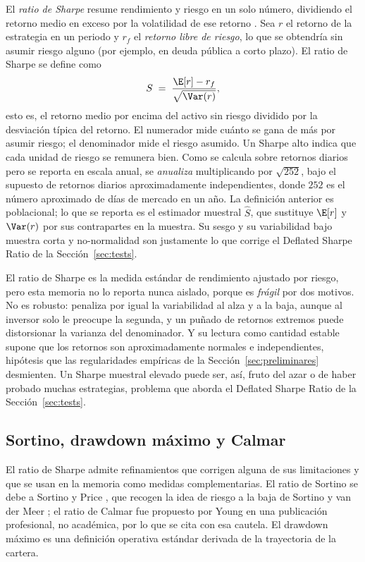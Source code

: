 El \emph{ratio de Sharpe} resume rendimiento y riesgo en un solo número, dividiendo el retorno medio en exceso por la volatilidad de ese retorno \cite{sharpe1994}. Sea $r$ el retorno de la estrategia en un periodo y $r_f$ el \emph{retorno libre de riesgo}, lo que se obtendría sin asumir riesgo alguno (por ejemplo, en deuda pública a corto plazo). El ratio de Sharpe se define como
\[
S \;=\; \frac{\E[r] - r_f}{\sqrt{\Var(r)}},
\]
esto es, el retorno medio por encima del activo sin riesgo dividido por la desviación típica del retorno. El numerador mide cuánto se gana de más por asumir riesgo; el denominador mide el riesgo asumido. Un Sharpe alto indica que cada unidad de riesgo se remunera bien. Como se calcula sobre retornos diarios pero se reporta en escala anual, se \emph{anualiza} multiplicando por $\sqrt{252}$, bajo el supuesto de retornos diarios aproximadamente independientes, donde $252$ es el número aproximado de días de mercado en un año. La definición anterior es poblacional; lo que se reporta es el estimador muestral $\hat S$, que sustituye $\E[r]$ y $\Var(r)$ por sus contrapartes en la muestra. Su sesgo y su variabilidad bajo muestra corta y no-normalidad son justamente lo que corrige el Deflated Sharpe Ratio de la Sección~\ref{sec:tests}.

El ratio de Sharpe es la medida estándar de rendimiento ajustado por riesgo, pero esta memoria no lo reporta nunca aislado, porque es \emph{frágil} por dos motivos. No es robusto: penaliza por igual la variabilidad al alza y a la baja, aunque al inversor solo le preocupe la segunda, y un puñado de retornos extremos puede distorsionar la varianza del denominador. Y su lectura como cantidad estable supone que los retornos son aproximadamente normales e independientes, hipótesis que las regularidades empíricas de la Sección~\ref{sec:preliminares} desmienten. Un Sharpe muestral elevado puede ser, así, fruto del azar o de haber probado muchas estrategias, problema que aborda el Deflated Sharpe Ratio de la Sección~\ref{sec:tests}.

\subsection{Sortino, drawdown máximo y Calmar}
\label{sec:economia-otros}

El ratio de Sharpe admite refinamientos que corrigen alguna de sus limitaciones y que se usan en la memoria como medidas complementarias. El ratio de Sortino se debe a Sortino y Price \cite{sortino1994}, que recogen la idea de riesgo a la baja de Sortino y van der Meer \cite{sortino1991}; el ratio de Calmar fue propuesto por Young \cite{young1991} en una publicación profesional, no académica, por lo que se cita con esa cautela. El drawdown máximo es una definición operativa estándar derivada de la trayectoria de la cartera.

